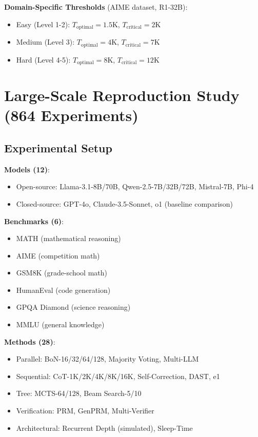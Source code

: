 \documentclass[10pt,preprint]{neurips_2024}
\begin{document}
\textbf{Domain-Specific Thresholds} (AIME dataset, R1-32B):
\begin{itemize}
    \item Easy (Level 1-2): $T_{\text{optimal}} = 1.5$K, $T_{\text{critical}} = 2$K
    \item Medium (Level 3): $T_{\text{optimal}} = 4$K, $T_{\text{critical}} = 7$K
    \item Hard (Level 4-5): $T_{\text{optimal}} = 8$K, $T_{\text{critical}} = 12$K
\end{itemize}

\section{Large-Scale Reproduction Study (864 Experiments)}

\subsection{Experimental Setup}

\textbf{Models (12)}:
\begin{itemize}
    \item Open-source: Llama-3.1-8B/70B, Qwen-2.5-7B/32B/72B, Mistral-7B, Phi-4
    \item Closed-source: GPT-4o, Claude-3.5-Sonnet, o1 (baseline comparison)
\end{itemize}

\textbf{Benchmarks (6)}:
\begin{itemize}
    \item MATH (mathematical reasoning)
    \item AIME (competition math)
    \item GSM8K (grade-school math)
    \item HumanEval (code generation)
    \item GPQA Diamond (science reasoning)
    \item MMLU (general knowledge)
\end{itemize}

\textbf{Methods (28)}:
\begin{itemize}
    \item Parallel: BoN-16/32/64/128, Majority Voting, Multi-LLM
    \item Sequential: CoT-1K/2K/4K/8K/16K, Self-Correction, DAST, e1
    \item Tree: MCTS-64/128, Beam Search-5/10
    \item Verification: PRM, GenPRM, Multi-Verifier
    \item Architectural: Recurrent Depth (simulated), Sleep-Time
\end{itemize}
\end{document}
